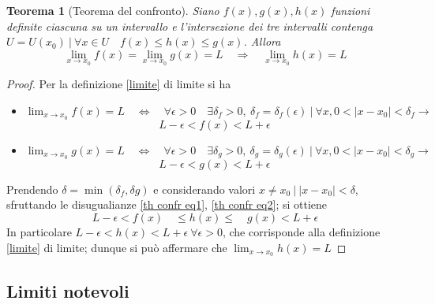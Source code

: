 \documentclass[]{report}
\theoremstyle{definition}
\theoremstyle{remark}
\theoremstyle{plain}
\newtheorem{theor}{Teorema}[chapter]
\numberwithin{equation}{chapter}
\begin{document}
\begin{theor}[Teorema del confronto]\label{th confr}
	Siano $f(x), g(x), h(x)$ funzioni definite ciascuna su un intervallo e l'intersezione dei tre intervalli contenga $U=U(x_{0}) \ | \ \forall x \in U \quad f(x)\leq h(x) \leq g(x)$. Allora
	$$\lim_{x \to x_{0}}f(x)=\lim_{x \to x_{0}}g(x)=L \quad \Longrightarrow \quad \lim_{x \to x_{0}}h(x)=L$$ 
\end{theor}
\begin{proof}
	Per la definizione \ref{limite} di limite si ha
	\begin{itemize}
		\item $\lim_{x\to x_{0}} f(x)=L \quad \Leftrightarrow \quad \forall \epsilon > 0 \quad \exists \delta_{f} > 0 ,\ \delta_{f} = \delta_{f} (\epsilon ) \ | \ \forall x, 0<|x-x_{0}|<\delta_{f} \rightarrow$
		\begin{equation}\label{th confr eq1}
			L-\epsilon<f(x)<L+\epsilon
		\end{equation}
		\item $\lim_{x\to x_{0}} g(x)=L \quad \Leftrightarrow \quad \forall \epsilon > 0 \quad \exists \delta_{g} > 0 ,\ \delta_{g} = \delta_{g} (\epsilon ) \ | \ \forall x, 0<|x-x_{0}|<\delta_{g} \rightarrow$
		\begin{equation}\label{th confr eq2}
			L-\epsilon<g(x)<L+\epsilon
		\end{equation}
	\end{itemize}
	Prendendo $\delta=\min(\delta_{f},\delta{g})$ e considerando valori $x \neq x_{0} \ | \ |x-x_{0}|<\delta$, sfruttando le disugualianze \eqref{th confr eq1}, \eqref{th confr eq2}; si ottiene
		$$L-\epsilon <f(x) \quad  \leq h(x) \leq \quad g(x) < L + \epsilon$$
		In particolare $L-\epsilon<h(x)<L+\epsilon \ \forall \epsilon>0$, che corrisponde alla definizione \ref{limite} di limite; dunque si pu\`{o} affermare che $\lim_{x \to x_{0}}h(x)=L$
\end{proof}

\subsection{Limiti notevoli}
\end{document}
